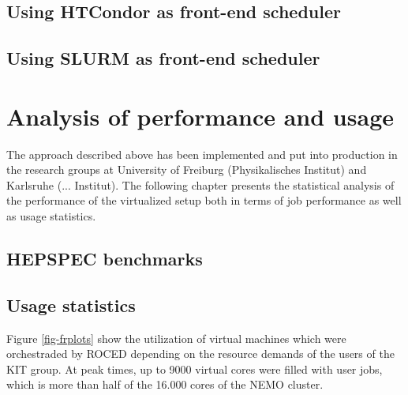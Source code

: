 \subsection{Using HTCondor as front-end scheduler}\label{sec:ROCED:HTCondor}


\subsection{Using SLURM as front-end scheduler}



\section{Analysis of performance and usage}

The approach described above has been implemented and put into
production in the research groups at University of Freiburg
(Physikalisches Institut) and Karlsruhe (... Institut).
The following chapter presents the statistical analysis of
the performance of the virtualized setup both in terms of job
performance as well as usage statistics.


\subsection{HEPSPEC benchmarks}




%
%
%
\subsection{Usage statistics}
Figure \ref{fig-frplots} show the utilization of virtual machines which were orchestraded by ROCED depending on the resource demands of the users of the KIT group. At peak times, up to 9000 virtual cores were filled with user jobs, which is more than half of the 16.000 cores of the NEMO cluster. 

